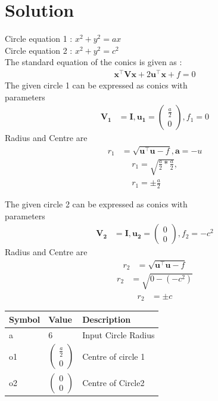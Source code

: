 \documentclass[journal,12pt,twocolumn]{IEEEtran}
\let\vec\mathbf
\newcommand{\myvec}[1]{\ensuremath{\begin{pmatrix}#1\end{pmatrix}}}
\begin{document}
\section{Solution}
\noindent Circle equation 1 : $x^2+y^2=ax$\\
Circle equation 2 : $x^2+y^2=c^2 $ \\
The standard equation of the conics is given as :
\begin{align}
\vec{x}^{\top}\vec{V}\vec{x}+2\vec{u}^{\top}\vec{x}+f=0
\end{align}
The given circle 1 can be expressed as conics with \\parameters
	\begin{align}
	\vec{V_1} &= \vec{I}, \vec{u_1} = \myvec{\frac{a}{2} \\0}, f_1 = 0
	\end{align}
	Radius and Centre are
	\begin{align}
	r_1 &=\sqrt{{\vec{u}^{\top}\vec{u}}-f },
	\vec{a}=-u
    \end{align}
    \begin{align}
	r_1 = \sqrt{\frac{a}{2}*\frac{a}{2}}, \\
	r_1  = \pm \frac{a}{2}	
    \end{align}
    
\noindent The given circle 2 can be expressed as conics with \\parameters
    \begin{align}
	\vec{V_2} &= \vec{I}, \vec{u_2} = \myvec{0 \\0}, f_2 = -c^2
	\end{align}
	Radius and Centre are
	\begin{align}
	r_2 &=\sqrt{{\vec{u}^{\top}\vec{u}}-f }
    \end{align}
    \begin{align}
	r_2 &=\sqrt{{0}-(-c^2) }
    \end{align}
    \begin{align}
	r_2 &=\pm c 
    \end{align}


\begin{table}[h]
\centering
\large
\begin{tabular}{|l|l|l|}
\hline
\textbf{Symbol} & \textbf{Value} & \textbf{Description} \\ \hline
a               & 6         &  Input Circle Radius             \\ \hline
o1              & $\myvec{\frac{a}{2} \\ 0}$         &  Centre of circle 1             \\ \hline
o2              & $\myvec{0\\0}$       & Centre of Circle2             \\ \hline

\end{tabular}
\end{table}
\end{document}
